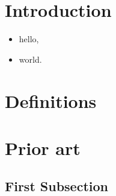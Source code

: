 \section{Introduction}

\blindtext{}

\begin{itemize}
  \item hello,
  \item world.
\end{itemize}

\blindtext{}

\section{Definitions}

\blindtext{}

\section{Prior art}

\blindtext{}

\subsection{First Subsection}

\blindtext{}
